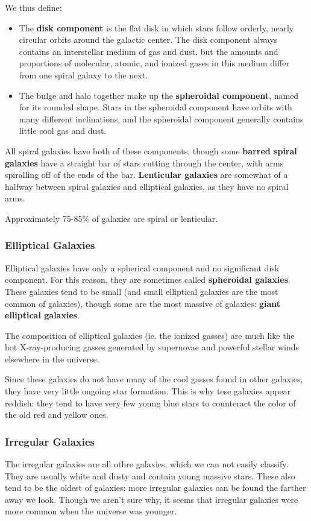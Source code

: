 We thus define:
\begin{itemize}
\item The {\bf disk component} is the flat disk in which stars follow orderly, nearly circular orbits around the galactic center. The disk component always contains an interstellar medium of gas and dust, but the amounts and proportions of molecular, atomic, and ionized gases in this medium differ from one spiral galaxy to the next.
\item The bulge and halo together make up the {\bf spheroidal component}, named for its rounded shape. Stars in the spheroidal component have orbits with many different inclinations, and the spheroidal component generally contains little cool gas and dust.
\end{itemize}

All spiral galaxies have both of these components, though some {\bf barred spiral galaxies} have a straight bar of stars cutting through the center, with arms spiralling off of the ends of the bar. {\bf Lenticular galaxies} are somewhat of a halfway between spiral galaxies and elliptical galaxies, as they have no spiral arms.

Approximately 75-85\% of galaxies are spiral or lenticular.

\subsubsection{Elliptical Galaxies}
Elliptical galaxies have only a spherical component and no significant disk component. For this reason, they are sometimes called {\bf spheroidal galaxies}. These galaxies tend to be small (and small elliptical galaxies are the most common of galaxies), though some are the most massive of galaxies: {\bf giant elliptical galaxies}.

The composition of elliptical galaxies (ie. the ionized gasses) are much like the hot X-ray-producing gasses generated by supernovae and powerful stellar winds elsewhere in the universe.

Since these galaxies do not have many of the cool gasses found in other galaxies, they have very little ongoing star formation. This is why tese galaxies appear reddish: they tend to have very few young blue stars to counteract the color of the old red and yellow ones.

\subsubsection{Irregular Galaxies}
The irregular galaxies are all othre galaxies, which we can not easily classify. They are usually white and dusty and contain young massive stars. These also tend to be the oldest of galaxies: more irregular galaxies can be found the farther away we look. Though we aren't sure why, it seems that irregular galaxies were more common when the universe was younger.

